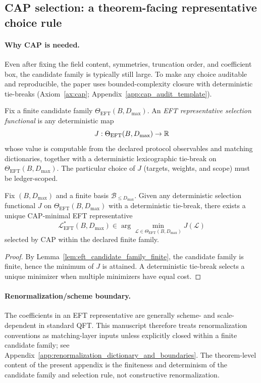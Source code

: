 \subsection{CAP selection: a theorem-facing representative choice rule}

\paragraph{Why CAP is needed.}
Even after fixing the field content, symmetries, truncation order, and coefficient box, the candidate family is typically still large.
To make any choice auditable and reproducible, the paper uses bounded-complexity closure with deterministic tie-breaks (Axiom~\ref{ax:cap}; Appendix~\ref{app:cap_audit_template}).

\begin{definition}\label{def:eft_selection_functional}
\AuditTag Fix a finite candidate family $\Theta_{\mathrm{EFT}}(B,D_{\max})$.
An \emph{EFT representative selection functional} is any deterministic map
\[
J:\Theta_{\mathrm{EFT}}(B,D_{\max})\to \mathbb{R}
\]
whose value is computable from the declared protocol observables and matching dictionaries, together with a deterministic lexicographic tie-break on $\Theta_{\mathrm{EFT}}(B,D_{\max})$.
The particular choice of $J$ (targets, weights, and scope) must be ledger-scoped.
\end{definition}

\begin{proposition}\label{prop:cap_minimal_eft_representative}
\MathTag Fix $(B,D_{\max})$ and a finite basis $\mathcal{B}_{\le D_{\max}}$.
Given any deterministic selection functional $J$ on $\Theta_{\mathrm{EFT}}(B,D_{\max})$ with a deterministic tie-break,
there exists a unique CAP-minimal EFT representative
\[
\mathcal{L}^{\ast}_{\mathrm{EFT}}(B,D_{\max})\in \arg\min_{\mathcal{L}\in\Theta_{\mathrm{EFT}}(B,D_{\max})} J(\mathcal{L})
\]
selected by CAP within the declared finite family.
\end{proposition}
\begin{proof}
By Lemma~\ref{lem:eft_candidate_family_finite}, the candidate family is finite, hence the minimum of $J$ is attained.
A deterministic tie-break selects a unique minimizer when multiple minimizers have equal cost.
\end{proof}

\paragraph{Renormalization/scheme boundary.}
\MatchTag The coefficients in an EFT representative are generally scheme- and scale-dependent in standard QFT.
This manuscript therefore treats renormalization conventions as matching-layer inputs unless explicitly closed within a finite candidate family; see Appendix~\ref{app:renormalization_dictionary_and_boundaries}.
The theorem-level content of the present appendix is the finiteness and determinism of the candidate family and selection rule, not constructive renormalization.

